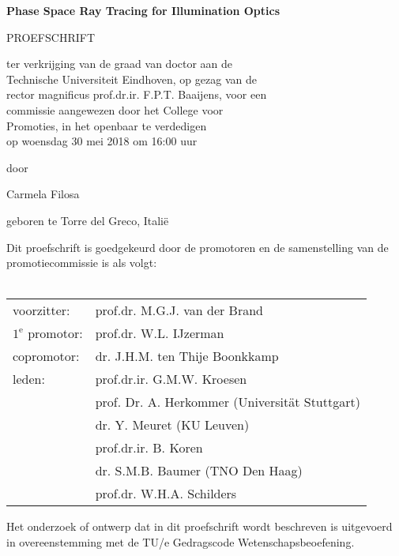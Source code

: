 \begin{center}
\begin{large}
\vspace*{3cm}
\textbf{Phase Space Ray Tracing for Illumination Optics}

\vspace*{2cm}

PROEFSCHRIFT

\vspace*{1.5cm}

ter verkrijging van de graad van doctor aan de \\ Technische Universiteit Eindhoven, op gezag van de \\ rector magnificus prof.dr.ir. F.P.T. Baaijens, voor een \\ commissie aangewezen door het College voor \\ Promoties, in het openbaar te verdedigen \\ op woensdag 30 mei 2018 om 16:00 uur






\vspace*{1.5cm}

door

\vspace*{1.5cm}

Carmela Filosa

\vspace*{1.5cm}

geboren te Torre del Greco, Itali\"e 

\end{large}
\end{center}

\clearpage
\thispagestyle{plain}
\begin{large}
\noindent Dit proefschrift is goedgekeurd door de promotoren en de samenstelling van de promotiecommissie is als volgt:\\
\vspace{0.4cm}\\
\begin{tabular}{ll}
voorzitter: & prof.dr. M.G.J. van der Brand\\
$1^{\text{e}}$ promotor: & prof.dr. W.L. IJzerman \\
copromotor: &  dr. J.H.M. ten Thije Boonkkamp \\
leden: & prof.dr.ir. G.M.W. Kroesen \\
& prof. Dr. A. Herkommer (Universität Stuttgart)\\
& dr. Y. Meuret (KU Leuven)\\
& prof.dr.ir. B. Koren\\
& dr. S.M.B. Baumer (TNO Den Haag)\\
& prof.dr. W.H.A. Schilders \\
\end{tabular}

\vspace*{10cm}
\noindent Het onderzoek of ontwerp dat in dit proefschrift  wordt beschreven is uitgevoerd in overeenstemming met de TU/e Gedragscode Wetenschapsbeoefening.
\end{large}
\clearpage


